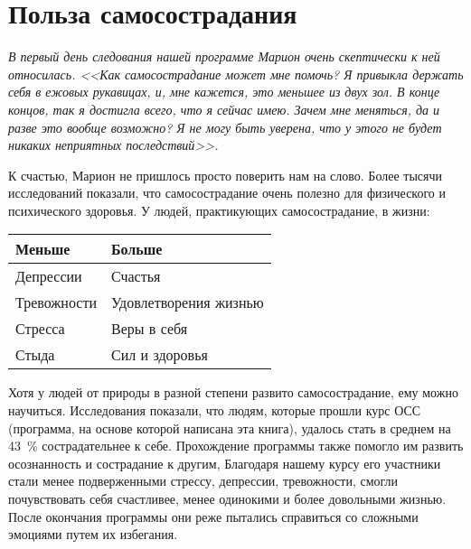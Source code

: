 
\section{Польза самосострадания} \label{The_Benefits_of_Self-Compassion}

\textit{В первый день следования нашей программе Марион очень скептически к ней относилась. <<Как самосострадание может мне помочь? Я привыкла держать себя в ежовых рукавицах, и, мне кажется, это меньшее из двух зол. В конце концов, так я достигла всего, что я сейчас имею. Зачем  мне меняться, да и разве это вообще возможно? Я не могу быть уверена, что у этого не будет никаких неприятных последствий>>.}

\vspace{2ex}

К счастью, Марион не пришлось просто поверить нам на слово. Более тысячи исследований показали, что самосострадание очень полезно для физического и психического здоровья. У людей, практикующих самосострадание, в жизни:

\begin{center}
	\setlength{\extrarowheight}{2mm}
	\begin{tabular}{p{4cm}p{5cm}}
		\textbf{Меньше} & \textbf{Больше} \\
		\hline \hline 
		Депрессии &	Счастья \\
		Тревожности	& Удовлетворения жизнью \\
		Стресса	& Веры в себя \\
		Стыда & Сил и здоровья \\
	\end{tabular}
	\setlength{\extrarowheight}{0mm}
\end{center}

\vspace{2ex}

Хотя у людей от природы в разной степени развито самосострадание, ему можно научиться. Исследования показали, что людям, которые прошли курс ОСС (программа, на основе которой написана эта книга), удалось стать в среднем на 43~\% сострадательнее к себе. Прохождение программы также помогло им развить осознанность и сострадание к другим, Благодаря нашему курсу его участники стали менее подверженными стрессу, депрессии, тревожности, смогли почувствовать себя счастливее, менее одинокими и более довольными жизнью. После окончания программы они реже пытались справиться со сложными эмоциями путем их избегания. 

